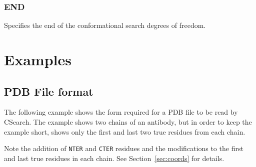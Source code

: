\documentclass{report}
\newcommand{\cs}{CSearch}
\newcommand{\es}{\relax}
\begin{document}
\subsubsection{END}
\es
Specifies the end of the conformational search degrees of freedom.

\section{Examples}
\subsection{PDB File format}
\label{ex:coords}
The following example shows the form required for a PDB file to be
read by \cs. The example shows two chains of an antibody, but in order
to keep the example short, shows only the first and last two true
residues from each chain.

Note the addition of {\tt NTER} and {\tt CTER} residues and the modifications
to the first and last true residues in each chain. See 
Section~\ref{sec:coords} for details.
\end{document}
